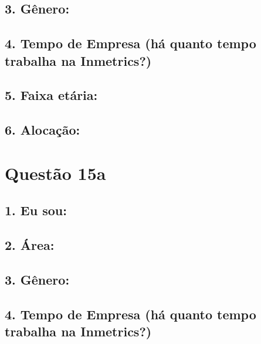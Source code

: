 \documentclass[]{book}
\begin{document}
\hypertarget{genero-22}{%
\subsection{3. Gênero:}\label{genero-22}}

\hypertarget{tempo-de-empresa-ha-quanto-tempo-trabalha-na-inmetrics-22}{%
\subsection{4. Tempo de Empresa (há quanto tempo trabalha na Inmetrics?)}\label{tempo-de-empresa-ha-quanto-tempo-trabalha-na-inmetrics-22}}

\hypertarget{faixa-etaria-22}{%
\subsection{5. Faixa etária:}\label{faixa-etaria-22}}

\hypertarget{alocacao-22}{%
\subsection{6. Alocação:}\label{alocacao-22}}

\hypertarget{questao-15a}{%
\section{Questão 15a}\label{questao-15a}}

\hypertarget{eu-sou-23}{%
\subsection{1. Eu sou:}\label{eu-sou-23}}

\hypertarget{area-23}{%
\subsection{2. Área:}\label{area-23}}

\hypertarget{genero-23}{%
\subsection{3. Gênero:}\label{genero-23}}

\hypertarget{tempo-de-empresa-ha-quanto-tempo-trabalha-na-inmetrics-23}{%
\subsection{4. Tempo de Empresa (há quanto tempo trabalha na Inmetrics?)}\label{tempo-de-empresa-ha-quanto-tempo-trabalha-na-inmetrics-23}}
\end{document}

